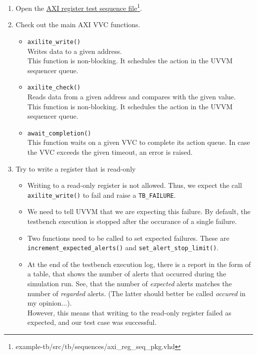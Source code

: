\begin{enumerate}
      \item Open the \href{../../example-tb/src/tb/sequences/axi\_reg\_seq\_pkg.vhd} {AXI register test sequence file}\footnote{example-tb/src/tb/sequences/axi\_reg\_seq\_pkg.vhd}.
      \item Check out the main AXI VVC functions.
            \begin{itemize}
                  \item \texttt{axilite\_write()}\\
                        Writes data to a given address.\\
                        This function is non-blocking. It schedules the action in the UVVM sequencer queue.
                  \item \texttt{axilite\_check()}\\
                        Reads data from a given address and compares with the given value.\\
                        This function is non-blocking. It schedules the action in the UVVM sequencer queue.
                  \item \texttt{await\_completion()}\\
                        This function waits on a given VVC to complete its action queue. In case the VVC exceeds the given timeout, an error is raised.\\
            \end{itemize}
      \item Try to write a register that is read-only
            \begin{itemize}
                  \item Writing to a read-only register is not allowed. Thus, we expect the call \texttt{axilite\_write()} to fail and raise a \texttt{TB\_FAILURE}.
                  \item We need to tell UVVM that we are expecting this failure. By default, the testbench execution is stopped after the occurance of a single failure.
                  \item Two functions need to be called to set expected failures. These are \texttt{increment\_expected\_alerts()} and \texttt{set\_alert\_stop\_limit()}.
                  \item At the end of the testbench execution log, there is a report in the form of a table, that shows the number of alerts that occurred during the simulation run. See, that the number of \textit{expected} alerts matches the number of \textit{regarded} alerts. (The latter should better be called \textit{occured} in my opinion...).\\
                        However, this means that writing to the read-only register failed as expected, and our test case was successful.
            \end{itemize}
\end{enumerate}

